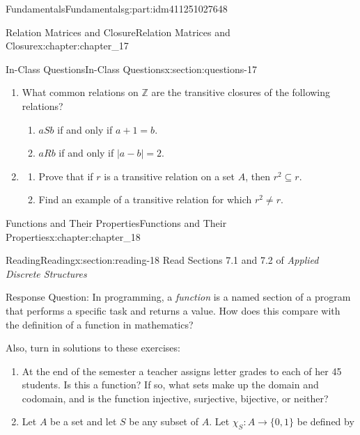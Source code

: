 \documentclass[oneside,10pt,]{book}
\numberwithin{equation}{section}
\begin{document}
\begin{partptx}{Fundamentals}{}{Fundamentals}{}{}{g:part:idm411251027648}
\begin{chapterptx}{Relation Matrices and Closure}{}{Relation Matrices and Closure}{}{}{x:chapter:chapter_17}
\begin{sectionptx}{In-Class Questions}{}{In-Class Questions}{}{}{x:section:questions-17}
\begin{enumerate}[label=\arabic*.]
%
\item{}What common relations on \(\mathbb{Z}\) are the transitive closures of the following relations?%
\par
%
\begin{enumerate}[label=(\alph*)]
\item{}\(a S b\) if and only if \(a + 1 = b\).%
\item{}\(a R b\) if and only if \(| a - b | = 2\).%
\end{enumerate}
%
\item{}%
\begin{enumerate}[label=(\alph*)]
\item{}Prove that if \(r\) is a transitive relation on a set \(A\), then \(r^2 \subseteq  r\).%
\item{}Find an example of a transitive relation for which \(r^2\neq r\).%
\end{enumerate}
%
\end{enumerate}
%
\end{sectionptx}
\end{chapterptx}
%
\typeout{************************************************}
\typeout{************************************************}
%
\begin{chapterptx}{Functions and Their Properties}{}{Functions and Their Properties}{}{}{x:chapter:chapter_18}
%
%
%
\typeout{************************************************}
\typeout{************************************************}
%
\begin{sectionptx}{Reading}{}{Reading}{}{}{x:section:reading-18}
Read Sections 7.1 and 7.2 of \emph{Applied Discrete Structures}%
\par
Response Question: In programming, a \emph{function} is a named section of a program that performs a specific task and returns a value.  How does this compare with the definition of a function in mathematics?%
\par
Also, turn in solutions to these exercises:%
\begin{enumerate}[label=\arabic*.]
\item{}At the end of the semester a teacher assigns letter grades to each of her 45 students. Is this a function? If so, what sets make up the domain and codomain, and is the function injective, surjective, bijective, or neither?%
\item{}Let \(A\) be a set and let \(S\) be any subset of \(A\). Let \(\chi_S: A\to \{0,1\}\) be defined by%

\end{enumerate}
\end{sectionptx}
\end{chapterptx}
\end{partptx}
\end{document}
